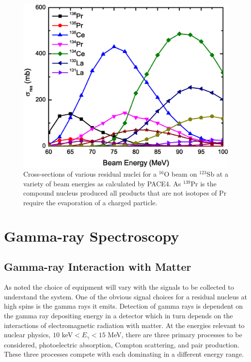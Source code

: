 \begin{figure}[h!]
	\centerline{\includegraphics[width=\textwidth]{./img/c3/135Pr_calc_plot.eps}}
	\caption{Cross-sections of various residual nuclei for a $^{16}$O beam on $^{123}$Sb at a variety of beam energies as calculated by PACE4. As $^{139}$Pr is the compound nucleus produced all products that are not isotopes of Pr require the evaporation of a charged particle.\label{fig:chp3-pace4-calc}}
\end{figure}

\section{Gamma-ray Spectroscopy}
\label{sec:exp-pr-gamma-spec}
\subsection{Gamma-ray Interaction with Matter}
\label{ssec:exp-pr-gamma-spec-interactions}
As noted the choice of equipment will vary with the signals to be collected to understand the system. One of the obvious signal choices for a residual nucleus at high spins is the gamma rays it emits. Detection of gamma rays is dependent on the gamma ray depositing energy in a detector which in turn depends on the interactions of electromagnetic radiation with matter. At the energies relevant to nuclear physics, $10$ keV$<E_{\gamma}<15$ MeV, there are three primary processes to be considered, photoelectric absorption, Compton scattering, and pair production. These three processes compete with each dominating in a different energy range.

